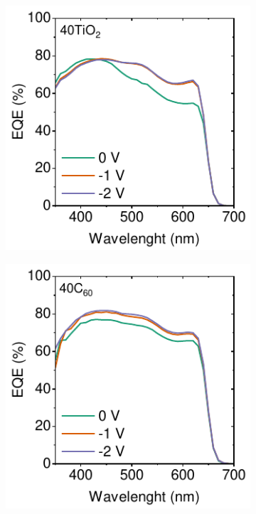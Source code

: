 \begin{figure}[!ht]
        \begin{subfigure}{0.32\textwidth}
        \centering
        \includegraphics[width=\textwidth]{chapters/transport_layers/images/EQE_40TiO2.pdf}
        \caption{}
        \label{}
    \end{subfigure}
    \hfill
    \begin{subfigure}{0.32\textwidth}
        \centering
        \includegraphics[width=\textwidth]{chapters/transport_layers/images/EQE_40C60.pdf}

\end{subfigure}
\end{figure}
